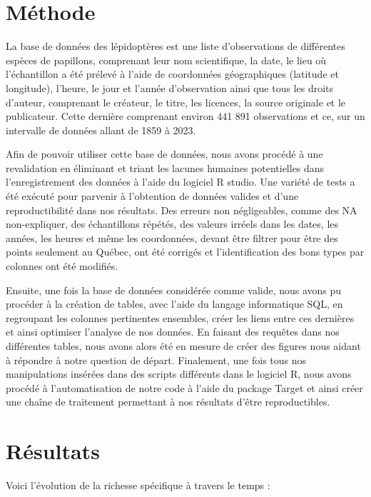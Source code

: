 \documentclass[9pt,twocolumn,twoside,]{pnas-new}
\begin{document}
\section*{Méthode}\label{muxe9thode}

La base de données des lépidoptères est une liste d'observations de
différentes espèces de papillons, comprenant leur nom scientifique, la
date, le lieu où l'échantillon a été prélevé à l'aide de coordonnées
géographiques (latitude et longitude), l'heure, le jour et l'année
d'observation ainsi que tous les droits d'auteur, comprenant le
créateur, le titre, les licences, la source originale et le publicateur.
Cette dernière comprenant environ 441 891 observations et ce, sur un
intervalle de données allant de 1859 à 2023.

Afin de pouvoir utiliser cette base de données, nous avons procédé à une
revalidation en éliminant et triant les lacunes humaines potentielles
dans l'enregistrement des données à l'aide du logiciel R studio. Une
variété de tests a été exécuté pour parvenir à l'obtention de données
valides et d'une reproductibilité dans nos résultats. Des erreurs non
négligeables, comme des NA non-expliquer, des échantillons répétés, des
valeurs irréels dans les dates, les années, les heures et même les
coordonnées, devant être filtrer pour être des points seulement au
Québec, ont été corrigés et l'identification des bons types par colonnes
ont été modifiés.

Ensuite, une fois la base de données considérée comme valide, nous avons
pu procéder à la création de tables, avec l'aide du langage informatique
SQL, en regroupant les colonnes pertinentes ensembles, créer les liens
entre ces dernières et ainsi optimiser l'analyse de nos données. En
faisant des requêtes dans nos différentes tables, nous avons alors été
en mesure de créer des figures nous aidant à répondre à notre question
de départ. Finalement, une fois tous nos manipulations insérées dans des
scripts différents dans le logiciel R, nous avons procédé à
l'automatisation de notre code à l'aide du package Target et ainsi créer
une chaîne de traitement permettant à nos résultats d'être
reproductibles.

\section*{Résultats}\label{ruxe9sultats}

Voici l'évolution de la richesse spécifique à travers le temps :
\end{document}
